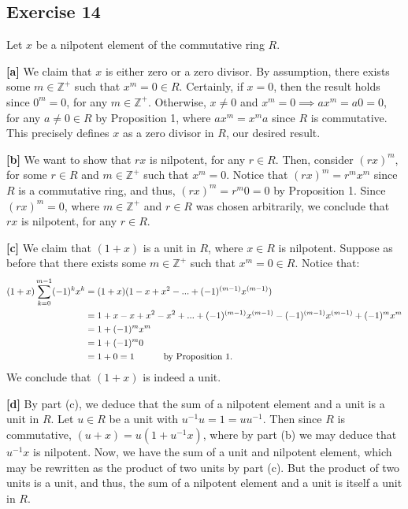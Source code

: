 \subsection*{Exercise 14}
Let $x$ be a nilpotent element of the commutative ring $R$.

\vspace{3 mm}

\textbf{[a]} We claim that $x$ is either zero or a zero divisor. By assumption, there exists some $m \in \mathbb{Z}^+$ such that $x^m = 0 \in R$. Certainly, if $x = 0$, then the result holds since $0^m = 0$, for any $m \in \mathbb{Z}^+$. Otherwise, $x \not= 0$ and $x^m = 0 \implies ax^m = a0 = 0$, for any $a \not= 0 \in R$ by Proposition 1, where $ax^m = x^ma$ since $R$ is commutative. This precisely defines $x$ as a zero divisor in $R$, our desired result.

\vspace{3 mm}

\textbf{[b]} We want to show that $rx$ is nilpotent, for any $r \in R$. Then, consider $(rx)^m$, for some $r \in R$ and $m \in \mathbb{Z}^+$ such that $x^m = 0$. Notice that $(rx)^m = r^mx^m$ since $R$ is a commutative ring, and thus, $(rx)^m = r^m0 = 0$ by Proposition 1. Since $(rx)^m = 0$, where $m \in \mathbb{Z}^+$ and $r \in R$ was chosen arbitrarily, we conclude that $rx$ is nilpotent, for any $r \in R$.

\vspace{3 mm}

\textbf{[c]} We claim that $(1 + x)$ is a unit in $R$, where $x \in R$ is nilpotent. Suppose as before that there exists some $m \in \mathbb{Z}^+$ such that $x^m = 0 \in R$. Notice that:
\begin{align*}
    (1 + x)\sum_{k=0}^{m-1}(-1)^kx^k &= (1 + x)(1 - x + x^2 - ... + (-1)^{(m-1)}x^{(m-1)}) \\
    &= 1 + x - x + x^2 - x^2 + ... + (-1)^{(m-1)}x^{(m-1)} - (-1)^{(m-1)}x^{(m-1)} + (-1)^mx^m \\
    &= 1 + (-1)^mx^m \\
    &= 1 + (-1)^m0 \\
    &= 1 + 0 = 1 \hspace{10 mm} \textnormal{ by Proposition 1}.
\end{align*}
We conclude that $(1 + x)$ is indeed a unit.

\vspace{3 mm}

\textbf{[d]} By part (c), we deduce that the sum of a nilpotent element and a unit is a unit in $R$. Let $u \in R$ be a unit with $u^{-1}u = 1 = uu^{-1}$. Then since $R$ is commutative, $(u + x) = u(1 + u^{-1}x)$, where by part (b) we may deduce that $u^{-1}x$ is nilpotent. Now, we have the sum of a unit and nilpotent element, which may be rewritten as the product of two units by part (c). But the product of two units is a unit, and thus, the sum of a nilpotent element and a unit is itself a unit in $R$.